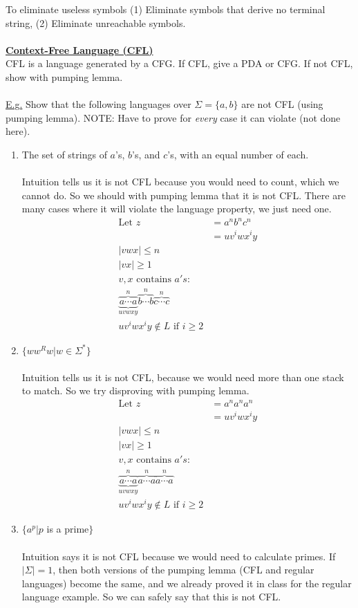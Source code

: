 \documentclass[8pt,letterpaper,twocolumn]{article}
\begin{document}
To eliminate useless symbols (1) Eliminate symbols that derive no terminal string,
(2) Eliminate unreachable symbols. \\
\\
\underline{\textbf{Context-Free Language (CFL)}} \\
CFL is a language generated by a CFG.
If CFL, give a PDA or CFG. If not CFL, show with pumping lemma. \\
\\
\underline{E.g.}
Show that the following languages over $\Sigma = \{a,b\}$ are not CFL (using pumping lemma).
NOTE: Have to prove for \emph{every} case it can violate (not done here).
\begin{enumerate}
  \item %
  The set of strings of $a$'s, $b$'s, and $c$'s, with an equal number of each. \\
  \\
  Intuition tells us it is not CFL because you would need to count, which we cannot do.
  So we should with pumping lemma that it is not CFL.
  There are many cases where it will violate the language property, we just need one.
  \begin{align*}
    \mbox{Let } z &= a^n b^n c^n \\
    &= u v^i w x^i y \\
    |vwx| \leq n \\
    |vx| \geq 1 \\
    v,x \mbox{ contains } a's: \\
    \overbrace{\underbrace{a \cdots a}_{uvwxy}}^{n} \overbrace{b \cdots b}^{n} \overbrace{c \cdots c}^{n} \\
    u v^i w x^i y \notin L \mbox{ if } i \geq 2
  \end{align*}

  \item %
  $\{ww^Rw|w \in \Sigma^*\}$ \\
  \\
  Intuition tells us it is not CFL, because we would need more than one stack to match.
  So we try disproving with pumping lemma.
  \begin{align*}
    \mbox{Let } z &= a^n a^n a^n \\
    &= u v^i w x^i y \\
    |vwx| \leq n \\
    |vx| \geq 1 \\
    v,x \mbox{ contains } a's: \\
    \overbrace{\underbrace{a \cdots a}_{uvwxy}}^{n} \overbrace{a \cdots a}^{n} \overbrace{a \cdots a}^{n} \\
    u v^i w x^i y \notin L \mbox{ if } i \geq 2
  \end{align*}
  \item %
  $\{a^p|p$ is a prime$\}$ \\
  \\
  Intuition says it is not CFL because we would need to calculate primes.
  If $|\Sigma| = 1$, then both versions of the pumping lemma (CFL and regular languages)
  become the same, and we already proved it in class for the regular language example.
  So we can safely say that this is not CFL.
\end{enumerate}
\end{document}
